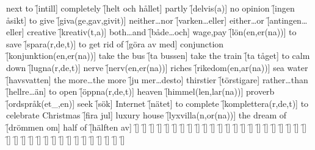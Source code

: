 \begin{questions}
    \begin{multicols}{2}
        \raggedcolumns
        \question next to \f[intill]
        \question completely \f[helt och hållet]
        \question partly \f[delvis(a)]
        \question no opinion \f[ingen åsikt]
        \question to give \f[giva(ge,gav,givit)]
        \question neither\ldots nor \f[varken\ldots eller]
        \question either\ldots or \f[antingen\ldots eller]
        \question creative \f[kreativ(t,a)]
        \question both\ldots and \f[både\ldots och]
        \question wage,pay \f[lön(en,er(na))]
        \question to save \f[spara(r,de,t)]
        \question to get rid of \f[göra av med]
        \question conjunction \f[konjunktion(en,er(na))]
        \question take the bus \f[ta bussen]
        \question take the train \f[ta tåget]
        \question to calm down \f[lugna(r,de,t)]
        \question nerve \f[nerv(en,er(na))]
        \question riches \f[rikedom(en,ar(na))]
        \question sea water \f[havsvatten]
        \question the more\ldots the more \f[ju mer\ldots desto]
        \question thirstier \f[törstigare]
        \question rather\ldots than \f[hellre\ldots än]
        \question to open \f[öppna(r,de,t)]
        \question heaven \f[himmel(len,lar(na))]
        \question proverb \f[ordspråk(et\_,en)]
        \question seek \f[sök]
        \question Internet \f[nätet]
        \question to complete \f[komplettera(r,de,t)]
        \question to celebrate Christmas \f[fira jul]
        \question luxury house \f[lyxvilla(n,or(na))]
        \question the dream of \f[drömmen om]
        \question half of \f[hälften av]
        \question  \f[]
        \question  \f[]
        \question  \f[]
        \question  \f[]
        \question  \f[]
        \question  \f[]
        \question  \f[]
        \question  \f[]
        \question  \f[]
        \question  \f[]
        \question  \f[]
        \question  \f[]
        \question  \f[]
        \question  \f[]
        \question  \f[]
        \question  \f[]
        \question  \f[]
        \question  \f[]
        \question  \f[]
        \question  \f[]
        \question  \f[]
        \question  \f[]
        \question  \f[]
        \question  \f[]
        \question  \f[]
        \question  \f[]
        \question  \f[]
        \question  \f[]
        \question  \f[]
        \question  \f[]
        \question  \f[]
        \question  \f[]
        \question  \f[]
        \question  \f[]
        \question  \f[]
        \question  \f[]
        \question  \f[]
        \question  \f[]
        \question  \f[]

\end{multicols}
\end{questions}

